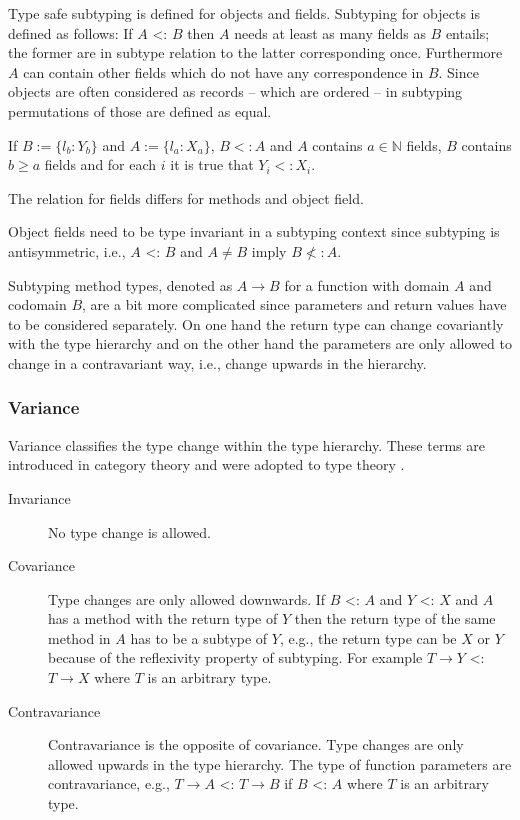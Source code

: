 Type safe subtyping is defined for objects and fields. Subtyping for
objects is defined as follows: If $A$ <: $B$ then $A$ needs at least
as many fields as $B$ entails; the former are in subtype relation to
the latter corresponding once. Furthermore $A$ can contain other fields
which do not have any correspondence in $B$. Since objects are often
considered as records -- which are ordered -- in subtyping permutations
of those are defined as equal.
\begin{defn}
	\label{def:subtypeObject}
	If $B := \{l_b : Y_b\}$ and $A := \{l_a : X_a\}$, $B <: A$ and $A$
	contains $a \in \mathbb{N}$ fields, $B$ contains $b \geq a$
	fields and for each $i$ it is true that $Y_i <: X_i$.
\end{defn}

The relation for fields differs for methods and object field.

Object fields need to be type invariant in a subtyping context since
subtyping is antisymmetric, i.e., $A$ <: $B$ and $A \neq B$ imply $B \nless: A$.

Subtyping method types, denoted as $A \rightarrow B$ for a function with
domain $A$ and codomain $B$, are a bit more complicated since parameters
and return values have to be considered separately. On one hand the return
type can change covariantly with the type hierarchy and on the other hand
the parameters are only allowed to change in a contravariant way, i.e.,
change upwards in the hierarchy.

\begin{defn}
\label{def:methodSubtyping}
	\begin{mathpar}
	\end{mathpar}
\end{defn}

\subsubsection{Variance}
Variance classifies the type change within the type hierarchy. These
terms are introduced in category theory and were adopted to type theory
\cite{pierce_basic_1991}.

\begin{description}
	\item[Invariance] No type change is allowed.
	\item[Covariance] Type changes are only allowed downwards. If $B$
	<: $A$ and $Y$ <: $X$ and $A$ has a method with the return
	type of $Y$ then the return type of the same method in $A$
	has to be a subtype of $Y$, e.g., the return type can be $X$
	or $Y$ because of the reflexivity property of subtyping. For
	example $T \rightarrow Y$ <: $T \rightarrow X$ where $T$ is an
	arbitrary type.
	\item[Contravariance] Contravariance is the opposite of
	covariance. Type changes are only allowed upwards in the type
	hierarchy. The type of function parameters are contravariance,
	e.g., $T \rightarrow A$ <: $T \rightarrow B$ if $B$ <: $A$ where
	$T$ is an arbitrary type.
\end{description}

